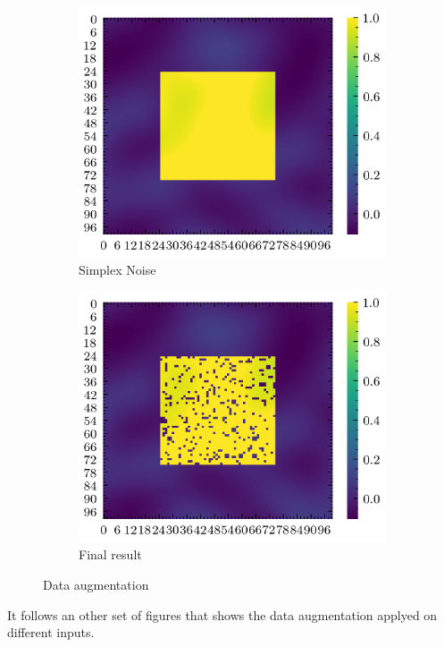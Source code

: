 \documentclass[../document.tex]{subfiles}
\begin{document}
\begin{figure}[H]
          \begin{subfigure}[b]{0.32\textwidth}
            \includegraphics[width=\textwidth]{../img/data-aug/2d/center-simplex.png}
            \caption{Simplex Noise}

        \end{subfigure}    
        \begin{subfigure}[b]{0.32\textwidth}
            \includegraphics[width=\textwidth]{../img/data-aug/2d/center-aug.png}
            \caption{Final result}
        \end{subfigure}    
    \label{fig: square-patch-aug}
    \caption{Data augmentation}    
\end{figure}
It follows an other set of figures that shows the data augmentation applyed on different inputs.
\end{document}
